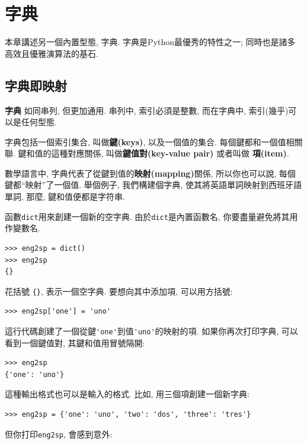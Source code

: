 \documentclass[10pt]{book}
\begin{document}
\chapter{字典}

本章講述另一個內置型態, 字典. 
字典是Python最優秀的特性之一; 同時也是諸多高效且優雅演算法的基石. 


\section{字典即映射}


 {\bf 字典} 如同串列, 但更加通用. 串列中, 索引必須是整數, 
而在字典中, 索引(幾乎)可以是任何型態. 

字典包括一個索引集合, 叫做{\bf 鍵(keys)}, 以及一個值的集合. 
每個鍵都和一個值相關聯. 鍵和值的這種對應關係, 叫做{\bf 鍵值對(key-value pair)}
或者叫做 {\bf 項(item)}.  

數學語言中, 字典代表了從鍵到值的{\bf 映射(mapping)}關係, 
所以你也可以說, 每個鍵都``映射''了一個值. 
舉個例子, 我們構建個字典, 使其將英語單詞映射到西班牙語單詞, 
那麼, 鍵和值便都是字符串. 

函數{\tt dict}用來創建一個新的空字典. 
由於{\tt dict}是內置函數名, 你要盡量避免將其用作變數名. 

\begin{verbatim}
>>> eng2sp = dict()
>>> eng2sp
{}
\end{verbatim}

花括號 \verb"{}", 表示一個空字典. 
要想向其中添加項, 可以用方括號:

\begin{verbatim}
>>> eng2sp['one'] = 'uno'
\end{verbatim}
%
這行代碼創建了一個從鍵\verb"'one'"到值\verb"'uno'"的映射的項. 
如果你再次打印字典, 可以看到一個鍵值對, 其鍵和值用冒號隔開:

\begin{verbatim}
>>> eng2sp
{'one': 'uno'}
\end{verbatim}
%

這種輸出格式也可以是輸入的格式. 比如, 用三個項創建一個新字典:

\begin{verbatim}
>>> eng2sp = {'one': 'uno', 'two': 'dos', 'three': 'tres'}
\end{verbatim}
%
但你打印{\tt eng2sp}, 會感到意外:
\end{document}
